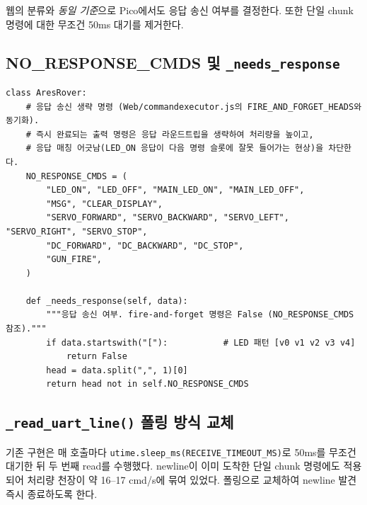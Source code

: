 \documentclass[11pt, oneside]{article}
\begin{document}
웹의 분류와 \emph{동일 기준}으로 Pico에서도 응답 송신 여부를
결정한다. 또한 단일 chunk 명령에 대한 무조건 50ms 대기를 제거한다.

\subsection{NO\_RESPONSE\_CMDS 및 \texttt{\_needs\_response}}

\begin{verbatim}
class AresRover:
    # 응답 송신 생략 명령 (Web/commandexecutor.js의 FIRE_AND_FORGET_HEADS와 동기화).
    # 즉시 완료되는 출력 명령은 응답 라운드트립을 생략하여 처리량을 높이고,
    # 응답 매칭 어긋남(LED_ON 응답이 다음 명령 슬롯에 잘못 들어가는 현상)을 차단한다.
    NO_RESPONSE_CMDS = (
        "LED_ON", "LED_OFF", "MAIN_LED_ON", "MAIN_LED_OFF",
        "MSG", "CLEAR_DISPLAY",
        "SERVO_FORWARD", "SERVO_BACKWARD", "SERVO_LEFT", "SERVO_RIGHT", "SERVO_STOP",
        "DC_FORWARD", "DC_BACKWARD", "DC_STOP",
        "GUN_FIRE",
    )

    def _needs_response(self, data):
        """응답 송신 여부. fire-and-forget 명령은 False (NO_RESPONSE_CMDS 참조)."""
        if data.startswith("["):           # LED 패턴 [v0 v1 v2 v3 v4]
            return False
        head = data.split(",", 1)[0]
        return head not in self.NO_RESPONSE_CMDS
\end{verbatim}

\subsection{\texttt{\_read\_uart\_line()} 폴링 방식 교체}

기존 구현은 매 호출마다 \texttt{utime.sleep\_ms(RECEIVE\_TIMEOUT\_MS)}로
50ms를 무조건 대기한 뒤 두 번째 read를 수행했다. newline이 이미 도착한
단일 chunk 명령에도 적용되어 처리량 천장이 약 16--17 cmd/s에 묶여
있었다. 폴링으로 교체하여 newline 발견 즉시 종료하도록 한다.
\end{document}
